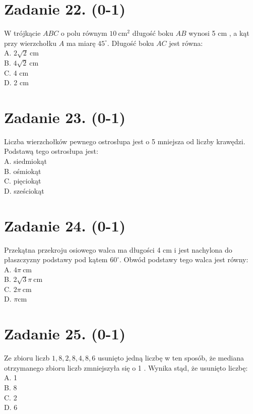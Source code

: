 \documentclass[10pt]{article}
\begin{document}
\section*{Zadanie 22. (0-1)}
W trójkącie \(A B C\) o polu równym \(10 \mathrm{~cm}^{2}\) długość boku \(A B\) wynosi 5 cm , a kąt przy wierzchołku \(A\) ma miarę \(45^{\circ}\). Długość boku \(A C\) jest równa:\\
A. \(2 \sqrt{2} \mathrm{~cm}\)\\
B. \(4 \sqrt{2} \mathrm{~cm}\)\\
C. 4 cm\\
D. 2 cm

\section*{Zadanie 23. (0-1)}
Liczba wierzchołków pewnego ostrosłupa jest o 5 mniejsza od liczby krawędzi. Podstawą tego ostrosłupa jest:\\
A. siedmiokąt\\
B. ośmiokąt\\
C. pięciokąt\\
D. sześciokąt

\section*{Zadanie 24. (0-1)}
Przekątna przekroju osiowego walca ma długości 4 cm i jest nachylona do płaszczyzny podstawy pod kątem \(60^{\circ}\). Obwód podstawy tego walca jest równy:\\
A. \(4 \pi \mathrm{~cm}\)\\
B. \(2 \sqrt{3} \pi \mathrm{~cm}\)\\
C. \(2 \pi \mathrm{~cm}\)\\
D. \(\pi \mathrm{cm}\)

\section*{Zadanie 25. (0-1)}
Ze zbioru liczb \(1,8,2,8,4,8,6\) usunięto jedną liczbę w ten sposób, że mediana otrzymanego zbioru liczb zmniejszyła się o 1 . Wynika stąd, że usunięto liczbę:\\
A. 1\\
B. 8\\
C. 2\\
D. 6
\end{document}
